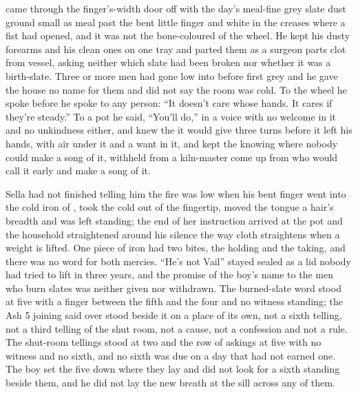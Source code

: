  came through the finger's-width door off  with the day's meal-fine grey slate dust ground small as meal past the bent little finger and white in the creases where a fist had opened, and it was not the bone-coloured  of the wheel. He kept his dusty forearms and his clean ones on one tray and parted them as a surgeon parts clot from vessel, asking neither which slate had been broken nor whether it was a birth-slate. Three or more men had gone low into  before first grey and he gave the house no name for them and did not say the room was cold. To the wheel he spoke before he spoke to any person: “It doesn't care whose hands. It cares if they're steady.” To a pot he said, “You'll do,” in a voice with no welcome in it and no unkindness either, and knew the  it would give three turns before it left his hands, with air under it and a want in it, and kept the knowing where nobody could make a song of it, withheld from a kiln-master come up from  who would call it early and make a song of it.

Sella had not finished telling him the fire was low when his bent finger went into the cold iron of , took the cold out of the fingertip, moved the tongue a hair's breadth and was left standing; the end of her instruction arrived at the pot and the household straightened around his silence the way cloth straightens when a weight is lifted. One piece of iron had two bites, the holding and the taking, and there was no  word for both mercies. “He's not Vail” stayed sealed as a lid nobody had tried to lift in three years, and the promise of the boy's name to the men who burn slates was neither given nor withdrawn. The burned-slate word stood at five with a finger between the fifth and the four and no witness standing; the Ash 5 joining said over  stood beside it on a place of its own, not a sixth telling, not a third telling of the shut room, not a cause, not a confession and not a rule. The shut-room tellings stood at two and the row of askings at five with no witness and no sixth, and no sixth was due on a day that had not earned one. The boy set the five down where they lay and did not look for a sixth standing beside them, and he did not lay the new breath at the sill across any of them.

\scenebreak

